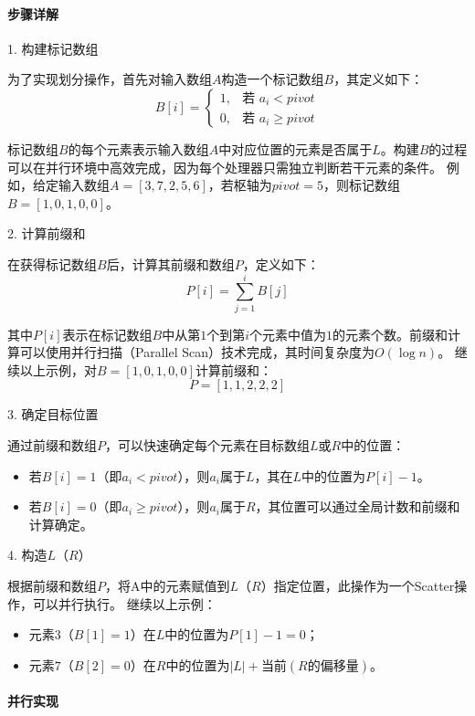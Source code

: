   \paragraph{步骤详解}

1. 构建标记数组

为了实现划分操作，首先对输入数组\(A\)构造一个标记数组\(B\)，其定义如下：
\[
B[i]=
\begin{cases}
1, & \text{若 } a_{i}<pivot\\
0, & \text{若 } a_{i}\geq pivot
\end{cases}
\]

标记数组\(B\)的每个元素表示输入数组\(A\)中对应位置的元素是否属于\(L\)。构建\(B\)的过程可以在并行环境中高效完成，因为每个处理器只需独立判断若干元素的条件。
例如，给定输入数组\(A = [3,7,2,5,6]\)，若枢轴为\(pivot = 5\)，则标记数组\(B=[1,0,1,0,0]\)。

2. 计算前缀和

在获得标记数组\(B\)后，计算其前缀和数组\(P\)，定义如下：
\[
P[i]=\sum_{j = 1}^{i}B[j]
\]

其中\(P[i]\)表示在标记数组\(B\)中从第\(1\)个到第\(i\)个元素中值为\(1\)的元素个数。前缀和计算可以使用并行扫描（Parallel Scan）技术完成，其时间复杂度为\(O(\log n)\)。
继续以上示例，对\(B = [1,0,1,0,0]\)计算前缀和：
\[
P=[1,1,2,2,2]
\]

3. 确定目标位置

通过前缀和数组\(P\)，可以快速确定每个元素在目标数组\(L\)或\(R\)中的位置：
\begin{itemize}
    \item 若\(B[i] = 1\)（即\(a_{i}<pivot\)），则\(a_{i}\)属于\(L\)，其在\(L\)中的位置为\(P[i] - 1\)。
    \item 若\(B[i] = 0\)（即\(a_{i}\geq pivot\)），则\(a_{i}\)属于\(R\)，其位置可以通过全局计数和前缀和计算确定。
\end{itemize}

4. 构造$L$（$R$）

 根据前缀和数组\(P\)，将A中的元素赋值到$L$（$R$）指定位置，此操作为一个Scatter操作，可以并行执行。
继续以上示例：
\begin{itemize}
    \item 元素\(3\)（\(B[1]=1\)）在\(L\)中的位置为\(P[1] - 1 = 0\)；
    \item 元素\(7\)（\(B[2]=0\)）在\(R\)中的位置为\(\vert L\vert+\text{当前}(R\text{的偏移量})\)。
\end{itemize}




\paragraph{并行实现}

